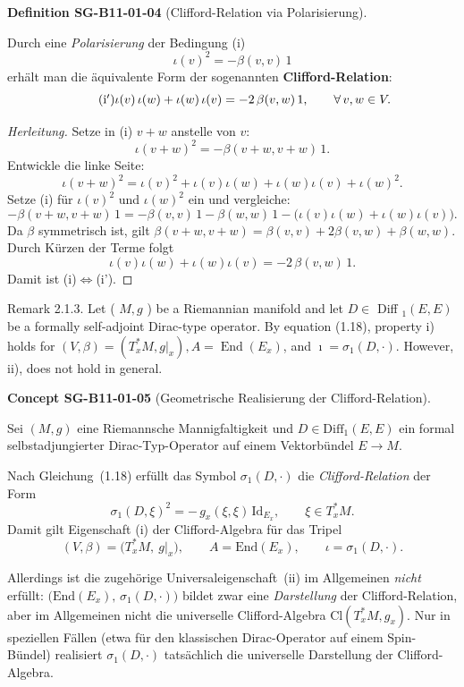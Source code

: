 \documentclass[10pt, letterpaper]{article}
\newcommand{\Cl}{\mathrm{Cl}}
\newcommand{\CustomHeading}[3]{%
  \par\medskip\noindent%
  \textbf{#1 #2} \textnormal{(#3)}.\enskip%
}
\newenvironment{DEF}[2]{\begin{unitbox}\CustomHeading{Definition}{#1}{#2}}{\end{unitbox}}
\newenvironment{CONC}[2]{\begin{unitbox}\CustomHeading{Concept}{#1}{#2}}{\end{unitbox}}
\begin{document}
\begin{DEF}{SG-B11-01-04}{Clifford-Relation via Polarisierung}
Durch eine \emph{Polarisierung} der Bedingung (i)
\[
\iota(v)^2=-\beta(v,v)\,1
\]
erhält man die äquivalente Form der sogenannten \textbf{Clifford-Relation}:
\[
\tag{$\mathrm{i}'$}
\iota(v)\,\iota(w)+\iota(w)\,\iota(v)=-2\,\beta(v,w)\,1,
\qquad\forall\,v,w\in V.
\]

\begin{proof}[Herleitung]
Setze in (i) $v+w$ anstelle von $v$:
\[
\iota(v+w)^2=-\beta(v+w,v+w)\,1.
\]
Entwickle die linke Seite:
\[
\iota(v+w)^2=\iota(v)^2+\iota(v)\iota(w)+\iota(w)\iota(v)+\iota(w)^2.
\]
Setze (i) für $\iota(v)^2$ und $\iota(w)^2$ ein und vergleiche:
\[
-\beta(v+w,v+w)\,1=-\beta(v,v)\,1-\beta(w,w)\,1-\big(\iota(v)\iota(w)+\iota(w)\iota(v)\big).
\]
Da $\beta$ symmetrisch ist, gilt $\beta(v+w,v+w)=\beta(v,v)+2\beta(v,w)+\beta(w,w)$.
Durch Kürzen der Terme folgt
\[
\iota(v)\iota(w)+\iota(w)\iota(v)=-2\,\beta(v,w)\,1.
\]
Damit ist (i)$\iff$(i').
\end{proof}
\end{DEF}




Remark 2.1.3. Let ( $M, g$ ) be a Riemannian manifold and let $D \in$ Diff $_{1}(E, E)$ be a formally self-adjoint Dirac-type operator. By equation (1.18), property i) holds for $(V, \beta)=\left(T_{x}^{*} M,\left.g\right|_{x}\right), A=\operatorname{End}\left(E_{x}\right)$, and $\imath=\sigma_{1}(D, \cdot)$. However, ii), does not hold in general.


\begin{CONC}{SG-B11-01-05}{Geometrische Realisierung der Clifford-Relation}
Sei $(M,g)$ eine Riemannsche Mannigfaltigkeit und 
$D \in \mathrm{Diff}_1(E,E)$ ein formal selbstadjungierter Dirac-Typ-Operator
auf einem Vektorbündel $E \to M$.  

Nach Gleichung~(1.18) erfüllt das Symbol $\sigma_1(D,\cdot)$ die
\emph{Clifford-Relation} der Form
\[
\sigma_1(D,\xi)^2 = -\,g_x(\xi,\xi)\,\mathrm{Id}_{E_x},
\qquad
\xi \in T_x^*M.
\]
Damit gilt Eigenschaft (i) der Clifford-Algebra für das Tripel
\[
(V,\beta) = \bigl(T_x^*M,\ g|_x\bigr),
\qquad
A = \mathrm{End}(E_x),
\qquad
\iota = \sigma_1(D,\cdot).
\]

Allerdings ist die zugehörige Universaleigenschaft~(ii) im Allgemeinen
\emph{nicht} erfüllt:
$\bigl(\mathrm{End}(E_x),\,\sigma_1(D,\cdot)\bigr)$ bildet zwar eine
\emph{Darstellung} der Clifford-Relation, aber im Allgemeinen nicht die
universelle Clifford-Algebra $\Cl(T_x^*M,g_x)$.  
Nur in speziellen Fällen (etwa für den klassischen Dirac-Operator auf einem
Spin-Bündel) realisiert $\sigma_1(D,\cdot)$ tatsächlich die universelle
Darstellung der Clifford-Algebra.
\end{CONC}
\end{document}
